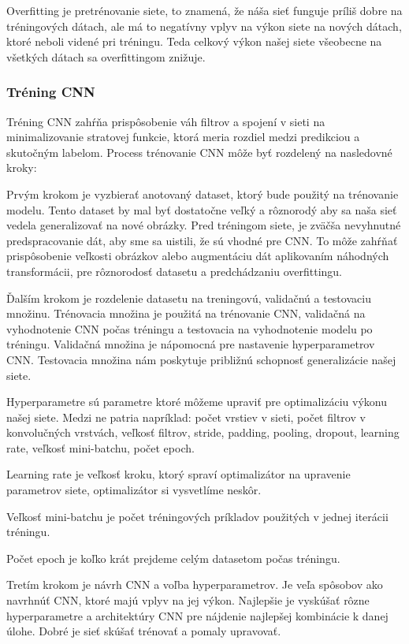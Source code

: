 Overfitting je pretrénovanie siete, to znamená, že náša sieť funguje príliš dobre na tréningových dátach, ale má to negatívny vplyv na výkon siete na nových dátach, ktoré neboli videné pri tréningu. Teda celkový výkon našej siete všeobecne na všetkých dátach sa overfittingom znižuje.

\subsubsection{Tréning CNN}
\hspace{\parindent}Tréning CNN zahŕňa prispôsobenie váh filtrov a spojení v sieti na minimalizovanie stratovej funkcie, ktorá meria rozdiel medzi predikciou a skutočným labelom. Process trénovanie CNN môže byť rozdelený na nasledovné kroky:

Prvým krokom je vyzbierať anotovaný dataset, ktorý bude použitý na trénovanie modelu. Tento dataset by mal byť dostatočne veľký a rôznorodý aby sa naša sieť vedela generalizovať na nové obrázky. Pred tréningom siete, je zväčša nevyhnutné predspracovanie dát, aby sme sa uistili, že sú vhodné pre CNN. To môže zahŕňať prispôsobenie veľkosti obrázkov alebo augmentáciu dát aplikovaním náhodných transformácii, pre rôznorodosť datasetu a predchádzaniu overfittingu. 

Ďalším krokom je rozdelenie datasetu na treningovú, validačnú a testovaciu množinu. Trénovacia množina je použitá na trénovanie CNN, validačná na vyhodnotenie CNN počas tréningu a testovacia na vyhodnotenie modelu po tréningu. Validačná množina je nápomocná pre nastavenie hyperparametrov CNN. Testovacia množina nám poskytuje približnú schopnosť generalizácie našej siete. 

Hyperparametre sú parametre ktoré môžeme upraviť pre optimalizáciu výkonu našej siete. Medzi ne patria napríklad: počet vrstiev v sieti, počet filtrov v konvolučných vrstvách, veľkosť filtrov, stride, padding, pooling, dropout, learning rate, veľkosť mini-batchu, počet epoch.

Learning rate je veľkosť kroku, ktorý spraví optimalizátor na upravenie parametrov siete, optimalizátor si vysvetlíme neskôr. 

Veľkosť mini-batchu je počet tréningových príkladov použitých v jednej iterácii tréningu.

Počet epoch je koľko krát prejdeme celým datasetom počas tréningu. 

Tretím krokom je návrh CNN a voľba hyperparametrov. Je veľa spôsobov ako navrhnúť CNN, ktoré majú vplyv na jej výkon. Najlepšie je vyskúšať rôzne hyperparametre a architektúry CNN pre nájdenie najlepšej kombinácie k danej úlohe. Dobré je sieť skúšať trénovať a pomaly upravovať. 

